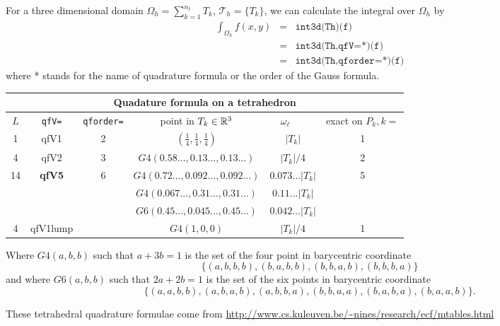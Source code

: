 \documentclass[a4paper,twoside,12pt]{book}
\begin{document}
For a three dimensional  domain  $\Omega_h=\sum_{k=1}^{n_t}T_k,\, \mathcal{T}_h=\{T_k\}$,
we can calculate the integral over $\Omega_h$ by
\begin{eqnarray*}
\int_{\Omega_h}f(x,y)&=&\texttt{int3d(Th)(f)}\\
&=&\texttt{int3d(Th,qfV=*)(f)}\\
&=&\texttt{int3d(Th,qforder=*)(f)}
\end{eqnarray*}
where * stands for the name of quadrature formula or the order of the Gauss formula.
\begin{center}

\begin{tabular}{|c|c|c|c|c|c|}
    \hline
      \multicolumn{6}{|c|}{ Quadature formula on a tetrahedron} \\
    \hline
    $L$ & \texttt{qfV=} & \texttt{qforder=} &
    point in $T_k\in \mathbb{R}^3$ & $\omega_\ell$~~~  &exact on $P_k, k=$  \\
    \hline
    \hline
    1 & qfV1&2&$\left(\frac{1}{4},\frac{1}{4},\frac{1}{4}\right)$ & $|T_k|$ & 1 \\
    \hline
    4 & qfV2&3& $ G4(0.58\ldots ,0.13\ldots ,0.13\ldots )$ & $|T_k|/4$ & 2 \\
    \hline
    14 & \textbf{qfV5}&6&$G4(0.72\ldots,0.092\ldots,0.092\ldots)$ & $ 0.073\ldots |T_k|$ & 5 \\
    & &                 &$G4(0.067\ldots,0.31\ldots,0.31\ldots)$ & $ 0.11\ldots     |T_k|$ & \\
    & &                 &$G6(0.45\ldots,0.045\ldots,0.45\ldots)$ & $ 0.042\ldots     |T_k|$ & \\

    \hline
    4 & qfV1lump& & $G4(1,0,0)$ & $|T_k|/4$ & 1 \\
    \hline
\end{tabular}
\end{center}
\medskip

 Where $G4 (a,b,b) $ such that $a+3b=1$ is the set of the four point in barycentric coordinate
 $$\{ (a,b,b,b), (b,a,b,b), (b,b,a,b),(b,b,b,a) \}$$ and where
 $G6 (a,b,b) $ such that $2a+2b=1$ is the set of the six points in barycentric coordinate
 $$\{ (a,a,b,b),(a,b,a,b),(a,b,b,a), (b,b,a,a),(b,a,b,a),(b,a,a,b) \}.$$

\begin{note} These tetrahedral quadrature formulae come from \url{http://www.cs.kuleuven.be/~nines/research/ecf/mtables.html}
\end{note}
 
\end{document}
